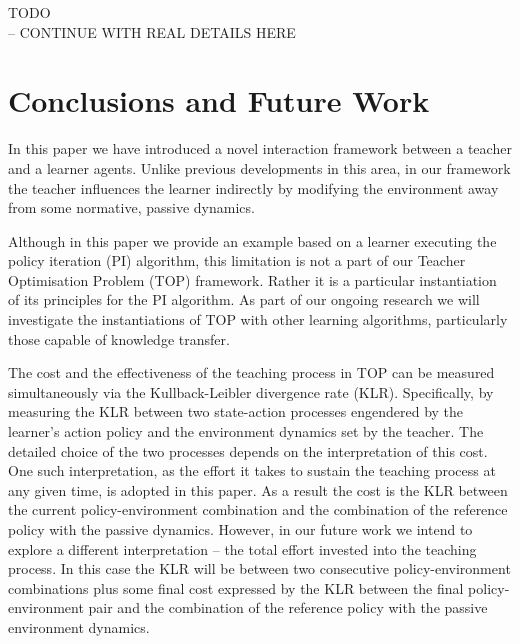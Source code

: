 \documentclass[letterpaper]{aamas2010}
\begin{document}
{\Large TODO\\ -- CONTINUE WITH REAL DETAILS HERE}

\section{Conclusions and Future Work}\label{sec: future work}

In this paper we have introduced a novel interaction framework between
a teacher and a learner agents. Unlike previous developments in this
area, in our framework the teacher influences the learner indirectly by
modifying the environment away from some normative, passive
dynamics. 

Although in this paper we provide an example based on a learner
executing the policy iteration (PI) algorithm, this limitation is not
a part of our Teacher Optimisation Problem (TOP) framework. Rather it
is a particular instantiation of its principles for the PI
algorithm. As part of our ongoing research we will investigate the
instantiations of TOP with other learning algorithms, particularly
those capable of knowledge transfer.

The cost and the effectiveness of the teaching process in TOP can
be measured simultaneously via the Kullback-Leibler divergence rate
(KLR). Specifically, by measuring the KLR between two state-action
processes engendered by the learner's action policy and the
environment dynamics set by the teacher. The detailed choice of the
two processes depends on the interpretation of this cost. One such
interpretation, as the effort it takes to sustain the teaching process
at any given time, is adopted in this paper. As a result the cost is
the KLR between the current policy-environment combination and the
combination of the reference policy with the passive
dynamics. However, in our future work we intend to explore a different
interpretation -- the total effort invested into the teaching
process. In this case the KLR will be between two consecutive
policy-environment combinations plus some final cost expressed by the
KLR between the final policy-environment pair and the combination of
the reference policy with the passive environment dynamics. 





\end{document}
